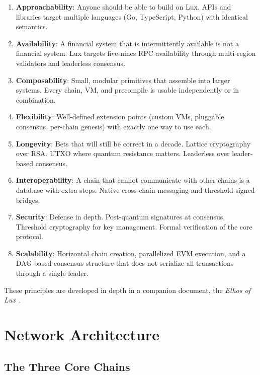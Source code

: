 \documentclass[11pt,a4paper]{article}
\begin{document}
\begin{enumerate}[leftmargin=*,nosep]
  \item \textbf{Approachability}: Anyone should be able to build on Lux.
        APIs and libraries target multiple languages (Go, TypeScript,
        Python) with identical semantics.
  \item \textbf{Availability}: A financial system that is intermittently
        available is not a financial system. Lux targets five-nines
        RPC availability through multi-region validators and
        leaderless consensus.
  \item \textbf{Composability}: Small, modular primitives that
        assemble into larger systems. Every chain, VM, and precompile
        is usable independently or in combination.
  \item \textbf{Flexibility}: Well-defined extension points (custom
        VMs, pluggable consensus, per-chain genesis) with exactly one
        way to use each.
  \item \textbf{Longevity}: Bets that will still be correct in a
        decade. Lattice cryptography over RSA. UTXO where quantum
        resistance matters. Leaderless over leader-based consensus.
  \item \textbf{Interoperability}: A chain that cannot communicate
        with other chains is a database with extra steps. Native
        cross-chain messaging and threshold-signed bridges.
  \item \textbf{Security}: Defense in depth. Post-quantum signatures
        at consensus. Threshold cryptography for key management.
        Formal verification of the core protocol.
  \item \textbf{Scalability}: Horizontal chain creation, parallelized
        EVM execution, and a DAG-based consensus structure that does
        not serialize all transactions through a single leader.
\end{enumerate}

These principles are developed in depth in a companion document, the
\emph{Ethos of Lux}~\cite{lux-ethos}.

\section{Network Architecture}

\subsection{The Three Core Chains}
\end{document}
